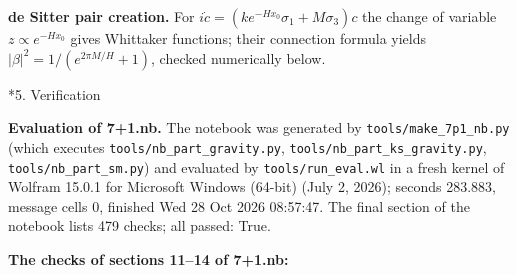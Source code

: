 \documentclass[10pt,a4paper]{article}
\makeatletter
\renewcommand\section{\@startsection{section}{1}{\z@}{-3.5ex \@plus -1ex \@minus -.2ex}{2.3ex \@plus.2ex}{\normalfont\Large\bfseries\raggedright}}
\makeatother
\begin{document}
\textbf{de Sitter pair creation.} For $i\dot c=(ke^{-Hx_0}\sigma_1+M\sigma_3)c$ the change of variable $z\propto e^{-Hx_0}$ gives Whittaker functions; their connection formula yields $|\beta|^2=1/(e^{2\pi M/H}+1)$, checked numerically below.

\section*{5. Verification}
\textbf{Evaluation of 7+1.nb.} The notebook was generated by \texttt{tools/\allowbreak{}make\_\allowbreak{}7p1\_\allowbreak{}nb.py} (which executes \texttt{tools/\allowbreak{}nb\_\allowbreak{}part\_\allowbreak{}gravity.py}, \texttt{tools/\allowbreak{}nb\_\allowbreak{}part\_\allowbreak{}ks\_\allowbreak{}gravity.py}, \texttt{tools/\allowbreak{}nb\_\allowbreak{}part\_\allowbreak{}sm.py}) and evaluated by \texttt{tools/\allowbreak{}run\_\allowbreak{}eval.wl} in a fresh kernel of Wolfram 15.0.1 for Microsoft Windows (64-bit) (July 2, 2026); seconds 283.883, message cells 0, finished Wed 28 Oct 2026 08:57:47. The final section of the notebook lists 479 checks; all passed: True.

\textbf{The checks of sections 11–14 of 7+1.nb:}
\end{document}
